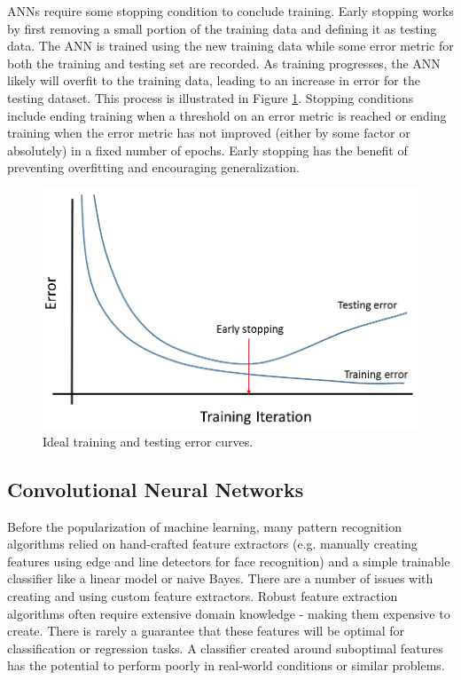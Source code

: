 ANNs require some stopping condition to conclude training. Early stopping works by first removing a small portion of the training data and defining it as testing data. The ANN is trained using the new training data while some error metric for both the training and testing set are recorded. As training progresses, the ANN likely will overfit to the training data, leading to an increase in error for the testing dataset. This process is illustrated in Figure \ref{fig:training_testing_error}. Stopping conditions include ending training when a threshold on an error metric is reached or ending training when the error metric has not improved (either by some factor or absolutely) in a fixed number of epochs. Early stopping has the benefit of preventing overfitting and encouraging generalization.

\begin{figure}[H]
	\centering
	\includegraphics[width=0.85\linewidth]{images/training_testing_error_v2}
	\caption{Ideal training and testing error curves.}
	\label{fig:training_testing_error}
\end{figure}

\subsection{Convolutional Neural Networks}

Before the popularization of machine learning, many pattern recognition algorithms relied on hand-crafted feature extractors (e.g. manually creating features using edge and line detectors for face recognition) and a simple trainable classifier like a linear model or naive Bayes. There are a number of issues with creating and using custom feature extractors. Robust feature extraction algorithms often require extensive domain knowledge - making them expensive to create. There is rarely a guarantee that these features will be optimal for classification or regression tasks. A classifier created around suboptimal features has the potential to perform poorly in real-world conditions or similar problems.

